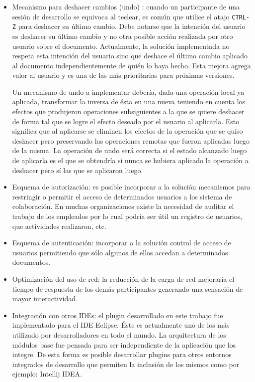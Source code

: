 \documentclass[12pt,a4paper]{article}
\begin{document}
\begin{itemize}
	\item Mecanismo para deshacer cambios (undo) \cite{undo1,undo2}: cuando un participante de una sesión de 
	desarrollo se equivoca al teclear, es común
		que utilice el atajo \texttt{CTRL-Z} para deshacer su último cambio. Debe notarse que la intención del usuario es deshacer su
		último cambio y no otra posible acción realizada por otro usuario sobre el documento. Actualmente, la solución implementada
		no respeta esta intención del usuario sino que deshace el último cambio aplicado al documento independientemente de
		quién lo haya hecho. Esta mejora agrega valor al usuario y es una de las más prioritarias para próximas versiones.
		
		Un mecanismo de undo a implementar debería, dada una operación local ya aplicada, transformar la inversa de ésta en una nueva
		teniendo en cuenta los efectos que produjeron operaciones subsiguientes a la que se quiere deshacer de forma tal que se logre 
		el efecto deseado por el usuario al aplicarla. Esto significa que al aplicarse se eliminen los efectos de la operación que
		se quiso deshacer pero preservando las operaciones remotas que fueron aplicadas luego de la misma. La operación de undo será
		correcta si el estado alcanzado luego de aplicarla es el que se obtendría si nunca se hubiera aplicado la operación a deshacer
		pero sí las que se aplicaron luego.
		
	\item Esquema de autorización: es posible incorporar a la solución mecanismos para restringir o permitir el acceso de determinados
		usuarios a los sistema de colaboración. En muchas organizaciones existe la necesidad de auditar el trabajo de los empleados 
		por lo cual podría ser útil un registro de usuarios, que actividades realizaron, etc.

	\item Esquema de autenticación: incorporar a la solución control de acceso de usuarios permitiendo que sólo algunos
		de ellos accedan a determinados documentos.

	\item Optimización del uso de red: la reducción de la carga de red mejoraría el tiempo de respuesta de los demás participantes
		generando una sensación de mayor interactividad.

	\item Integración con otros IDEs: el plugin desarrollado en este trabajo fue implementado para el IDE Eclipse. Éste es
		actualmente uno de los más utilizado por desarrolladores en todo el mundo. La arquitectura de los módulos base fue pensada 
		para ser independiente de la aplicación que los integre. De esta forma es posible desarrollar plugins para otros entornos
		integrados de desarrollo que permiten la inclusión de los mismos como por ejemplo: Intellij IDEA.


\end{itemize}
\end{document}

